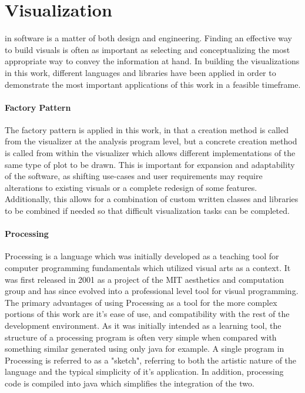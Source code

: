 \section{Visualization}
\label{visualization}

 in software is a matter of both design and engineering. Finding an effective way to build visuals is often as important as selecting and conceptualizing the most appropriate way to convey the information at hand. In building the visualizations in this work, different languages and libraries have been applied in order to demonstrate the most important applications of this work in a feasible timeframe. 

\paragraph{Factory Pattern}
The factory pattern is applied in this work, in that a creation method is called from the visualizer at the analysis program level, but a concrete creation method is called from within the visualizer which allows different implementations of the same type of plot to be drawn. This is important for expansion and adaptability of the software, as shifting use-cases and user requirements may require alterations to existing visuals or a complete redesign of some features. Additionally, this allows for a combination of custom written classes and libraries to be combined if needed so that difficult visualization tasks can be completed.

\paragraph{Processing}
Processing is a language which was initially developed as a teaching tool for computer programming fundamentals which utilized visual arts as a context. It was first released in 2001 as a project of the MIT aesthetics and computation group and has since evolved into a professional level tool for visual programming. The primary advantages of using Processing as a tool for the more complex portions of this work are it's ease of use, and compatibility with the rest of the development environment. As it was initially intended as a learning tool, the structure of a processing program is often very simple when compared with something similar generated using only java for example. A single program in Processing is referred to as a "sketch", referring to both the artistic nature of the language and the typical simplicity of it's application. In addition, processing code is compiled into java which simplifies the integration of the two. 

